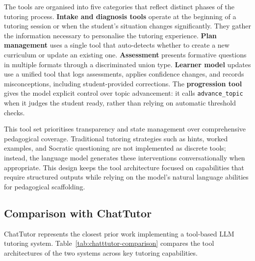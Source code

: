 \documentclass[logo,bsc,singlespacing,parskip,online]{infthesis}
\begin{document}
The tools are organised into five categories that reflect distinct phases of the tutoring process. \textbf{Intake and diagnosis tools} operate at the beginning of a tutoring session or when the student's situation changes significantly. They gather the information necessary to personalise the tutoring experience. \textbf{Plan management} uses a single tool that auto-detects whether to create a new curriculum or update an existing one. \textbf{Assessment} presents formative questions in multiple formats through a discriminated union type. \textbf{Learner model} updates use a unified tool that logs assessments, applies confidence changes, and records misconceptions, including student-provided corrections. The \textbf{progression tool} gives the model explicit control over topic advancement: it calls \texttt{advance\_topic} when it judges the student ready, rather than relying on automatic threshold checks.

This tool set prioritises transparency and state management over comprehensive pedagogical coverage. Traditional tutoring strategies such as hints, worked examples, and Socratic questioning are not implemented as discrete tools; instead, the language model generates these interventions conversationally when appropriate. This design keeps the tool architecture focused on capabilities that require structured outputs while relying on the model's natural language abilities for pedagogical scaffolding.

\subsection{Comparison with ChatTutor}

ChatTutor \citep{chen2024chattutor} represents the closest prior work implementing a tool-based LLM tutoring system. Table~\ref{tab:chatttutor-comparison} compares the tool architectures of the two systems across key tutoring capabilities.
\end{document}
